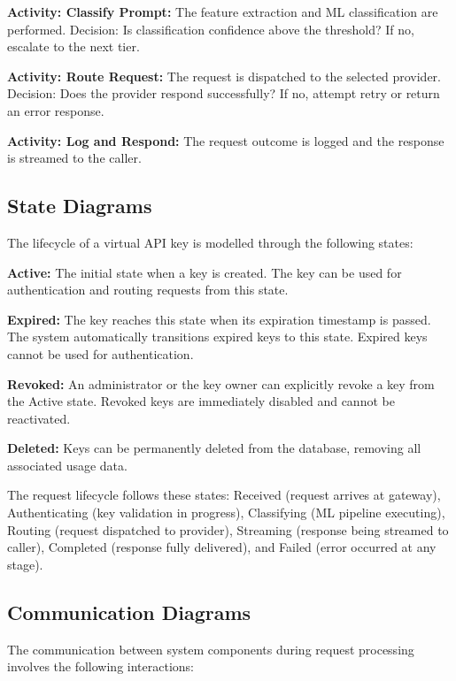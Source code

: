 \documentclass[oneside,12pt,a4paper]{report}
\begin{document}
\textbf{Activity: Classify Prompt:} The feature extraction and ML classification are performed. Decision: Is classification confidence above the threshold? If no, escalate to the next tier.

\textbf{Activity: Route Request:} The request is dispatched to the selected provider. Decision: Does the provider respond successfully? If no, attempt retry or return an error response.

\textbf{Activity: Log and Respond:} The request outcome is logged and the response is streamed to the caller.

\subsection{State Diagrams}

The lifecycle of a virtual API key is modelled through the following states:

\textbf{Active:} The initial state when a key is created. The key can be used for authentication and routing requests from this state.

\textbf{Expired:} The key reaches this state when its expiration timestamp is passed. The system automatically transitions expired keys to this state. Expired keys cannot be used for authentication.

\textbf{Revoked:} An administrator or the key owner can explicitly revoke a key from the Active state. Revoked keys are immediately disabled and cannot be reactivated.

\textbf{Deleted:} Keys can be permanently deleted from the database, removing all associated usage data.

The request lifecycle follows these states: Received (request arrives at gateway), Authenticating (key validation in progress), Classifying (ML pipeline executing), Routing (request dispatched to provider), Streaming (response being streamed to caller), Completed (response fully delivered), and Failed (error occurred at any stage).

\subsection{Communication Diagrams}

The communication between system components during request processing involves the following interactions:
\end{document}
